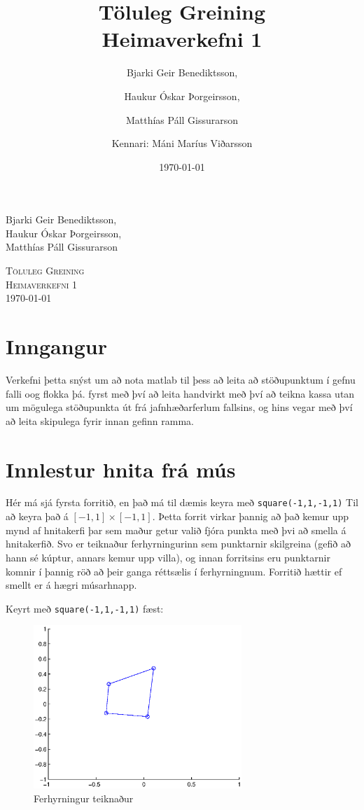 \documentclass[a4]{article}
\title{Töluleg Greining\\ Heimaverkefni 1}
\date{\today{}}
\author{ 
  Bjarki Geir Benediktsson,\and
  Haukur Óskar Þorgeirsson,\and
  Matthías Páll Gissurarson \and
  Kennari: Máni Maríus Viðarsson
  }
\begin{document}
\begin{flushright}
  Bjarki Geir Benediktsson,\\
  Haukur Óskar Þorgeirsson,\\
  Matthías Páll Gissurarson\\
\end{flushright}

\begin{center}
 \textsc{ \LARGE Töluleg Greining\\
  Heimaverkefni 1\\
  \today{}
  }
  \end{center}
\vfill

\maketitle
\section*{Inngangur}

Verkefni þetta snýst um að nota matlab til þess að leita að stöðupunktum í gefnu falli oog flokka þá. fyrst með því að leita handvirkt með því að teikna kassa utan um mögulega stöðupunkta út frá jafnhæðarferlum fallsins, og hins vegar með því að leita skipulega fyrir innan gefinn ramma.

\section{Innlestur hnita frá mús}

Hér má sjá fyrsta forritið, en það má til dæmis keyra með \lstinline{square(-1,1,-1,1)} Til að keyra það á $[-1,1] \times [-1,1]$. Þetta forrit virkar þannig að það kemur upp mynd af hnitakerfi þar sem maður getur valið fjóra punkta með þvi að smella á hnitakerfið. Svo er teiknaður ferhyrningurinn sem punktarnir skilgreina (gefið að hann sé kúptur, annars kemur upp villa), og innan forritsins eru punktarnir komnir í þannig röð að þeir ganga réttsælis í ferhyrningnum. Forritið hættir ef smellt er á hægri músarhnapp.



Keyrt með \lstinline{square(-1,1,-1,1)} fæst:

\begin{figure}[h!]
\centering
\includegraphics[width=0.7\textwidth]{squaredaemi.eps}
\caption{Ferhyrningur teiknaður}
\end{figure}
\end{document}
